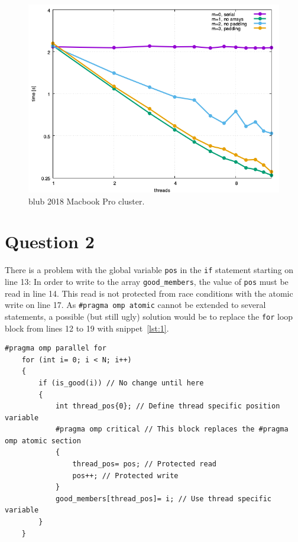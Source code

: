 \documentclass[11pt,a4paper]{article}
\begin{document}
\begin{figure}[ht]
\begin{center}
\includegraphics[scale=0.5]{results_mbp.png} 
\end{center}
\caption{blub 2018 Macbook Pro cluster.}
\label{fig:2}
\end{figure}



\section{Question 2}

There is a problem with the global variable \texttt{pos} in the \texttt{if} statement starting on line 13: In order to write to the array \texttt{good\_members}, the value of \texttt{pos}
must be read in line 14. This read is not protected from race conditions with the atomic write on line 17. As \texttt{\#pragma omp atomic} cannot be extended to several statements, a possible (but still ugly)
solution would be to replace the \texttt{for} loop block from lines 12 to 19 with snippet~\ref{lst:1}.

\begin{lstlisting}[float, caption='Blub', label={lst:1}]
    #pragma omp parallel for
    for (int i= 0; i < N; i++)
    {
        if (is_good(i)) // No change until here
        {
            int thread_pos{0}; // Define thread specific position variable
            #pragma omp critical // This block replaces the #pragma omp atomic section
            {
                thread_pos= pos; // Protected read
                pos++; // Protected write
            }
            good_members[thread_pos]= i; // Use thread specific variable
        }
    }
\end{lstlisting}
\end{document}
